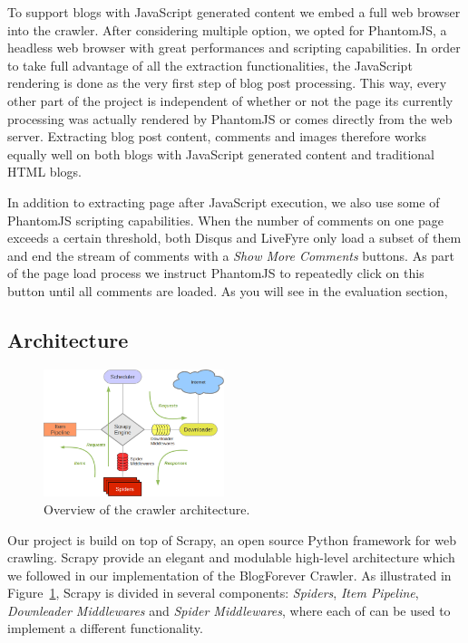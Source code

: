 To support blogs with JavaScript generated content we embed a full web browser into the crawler. After considering multiple option, we opted for PhantomJS\cite{phantomjs2013}, a headless web browser with great performances and scripting capabilities. In order to take full advantage of all the extraction functionalities, the JavaScript rendering is done as the very first step of blog post processing. This way, every other part of the project is independent of whether or not the page its currently processing was actually rendered by PhantomJS or comes directly from the web server. Extracting blog post content, comments and images therefore works equally well on both blogs with JavaScript generated content and traditional HTML blogs.

In addition to extracting page after JavaScript execution, we also use some of PhantomJS scripting capabilities. When the number of comments on one page exceeds a certain threshold, both Disqus and LiveFyre only load a subset of them and end the stream of comments with a \emph{Show More Comments} buttons. As part of the page load process we instruct PhantomJS to repeatedly click on this button until all comments are loaded. As you will see in the evaluation section, 


\subsection{Architecture}

\begin{figure}
  \capstart
  \centering
  \includegraphics[width=0.47\textwidth]{img/scrapy_architecture.png}
  \caption{Overview of the crawler architecture.}
  \label{architecture}
\end{figure}

Our project is build on top of Scrapy\cite{scra py2013}, an open source Python framework for web crawling. Scrapy provide an elegant and modulable high-level architecture which we followed in our implementation of the BlogForever Crawler. As illustrated in Figure~\ref{architecture}, Scrapy is divided in several components: \emph{Spiders}, \emph{Item Pipeline}, \emph{Downleader Middlewares} and \emph{Spider Middlewares}, where each of can be used to implement a different functionality.

